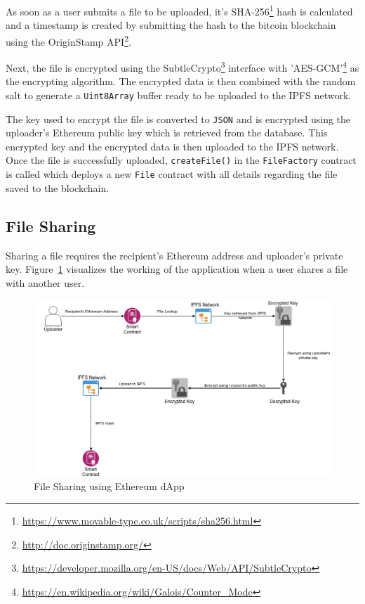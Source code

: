 As soon as a user submits a file to be uploaded, it's SHA-256\footnote{\url{https://www.movable-type.co.uk/scripts/sha256.html}} hash is calculated and a timestamp is created by submitting the hash to the bitcoin blockchain using the OriginStamp API\footnote{\url{http://doc.originstamp.org/}}.

Next, the file is encrypted using the SubtleCrypto\footnote{\url{https://developer.mozilla.org/en-US/docs/Web/API/SubtleCrypto}} interface with 'AES-GCM'\footnote{\url{https://en.wikipedia.org/wiki/Galois/Counter_Mode}} as the encrypting algorithm. The encrypted data is then combined with the random salt to generate a \texttt{Uint8Array} buffer ready to be uploaded to the IPFS network.

The key used to encrypt the file is converted to \texttt{JSON} and is encrypted using the uploader's Ethereum public key which is retrieved from the database. This encrypted key and the encrypted data is then uploaded to the IPFS network. Once the file is successfully uploaded, \texttt{createFile()} in the \texttt{FileFactory} contract is called which deploys a new \texttt{File} contract with all details regarding the file saved to the blockchain.

\subsection{File Sharing}
Sharing a file requires the recipient's Ethereum address and uploader's private key. Figure~\ref{fig:ethereum-share} visualizes the working of the application when a user shares a file with another user.

\begin{figure}[h]
	\includegraphics[width=\linewidth]{figures/ethereum-share}
	\caption{\label{fig:ethereum-share} File Sharing using Ethereum dApp}
\end{figure}

